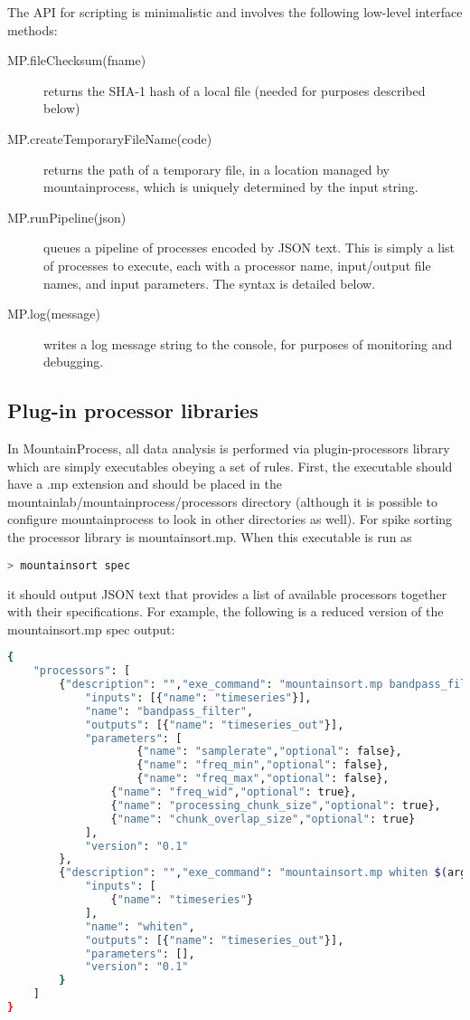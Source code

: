 \documentclass{article}
\begin{document}
The API for scripting is minimalistic and involves the following low-level interface methods:
\begin{description}
\item[MP.fileChecksum(fname)] returns the SHA-1 hash of a local file (needed for purposes described below)
\item[MP.createTemporaryFileName(code)] returns the path of a temporary file, in a location managed by mountainprocess, which is uniquely determined by the input string.
\item[MP.runPipeline(json)] queues a pipeline of processes encoded by JSON text. This is simply a list of processes to execute, each with a processor name, input/output file names, and input parameters. The syntax is detailed below.
\item[MP.log(message)] writes a log message string to the console, for purposes of monitoring and debugging.

\end{description}

\subsection{Plug-in processor libraries}

In MountainProcess, all data analysis is performed via plugin-processors library which are simply executables obeying a set of rules. First, the executable should have a .mp extension and should be placed in the mountainlab/mountainprocess/processors directory (although it is possible to configure mountainprocess to look in other directories as well). For spike sorting the processor library is mountainsort.mp. When this executable is run as
\begin{lstlisting}[language=bash]
> mountainsort spec
\end{lstlisting}
it should output JSON text that provides a list of available processors together with their specifications. For example, the following is a reduced version of the mountainsort.mp spec output:
\begin{lstlisting}[language=bash]
{
    "processors": [
        {"description": "","exe_command": "mountainsort.mp bandpass_filter $(arguments)",
            "inputs": [{"name": "timeseries"}],
            "name": "bandpass_filter",
            "outputs": [{"name": "timeseries_out"}],
            "parameters": [
                    {"name": "samplerate","optional": false},
                    {"name": "freq_min","optional": false},
                    {"name": "freq_max","optional": false},
                {"name": "freq_wid","optional": true},
                {"name": "processing_chunk_size","optional": true},
                {"name": "chunk_overlap_size","optional": true}
            ],
            "version": "0.1"
        },
        {"description": "","exe_command": "mountainsort.mp whiten $(arguments)",
            "inputs": [
                {"name": "timeseries"}
            ],
            "name": "whiten",
            "outputs": [{"name": "timeseries_out"}],
            "parameters": [],
            "version": "0.1"
        }
    ]
}
\end{lstlisting}
\end{document}
